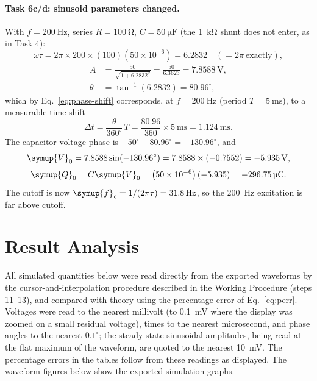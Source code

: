 \documentclass[12pt,a4paper]{article}
\begin{document}
	\paragraph{Task 6c/d: sinusoid parameters changed.}
	With $f = \SI{200}{\hertz}$, series $R = \SI{100}{\ohm}$,
	$C = \SI{50}{\micro\farad}$ (the \SI{1}{\kilo\ohm} shunt does not
	enter, as in Task 4):
	\begin{equation}
		\omega\tau = 2\pi \times 200 \times (100)\left(50\times 10^{-6}\right)
		= 6.2832 \quad \left(= 2\pi\ \text{exactly}\right),
	\end{equation}
	\begin{align}
		A &= \frac{50}{\sqrt{1 + 6.2832^2}}
		= \frac{50}{6.3623} = \SI{7.8588}{\volt},\\
		\theta &= \tan^{-1}(6.2832) = 80.96^{\circ},
	\end{align}
	which by Eq.~\eqref{eq:phase-shift} corresponds, at
	$f = \SI{200}{\hertz}$ (period $T = \SI{5}{\milli\second}$), to a
	measurable time shift
	\begin{equation}
		\Delta t = \frac{\theta}{360^{\circ}}\,T
		= \frac{80.96}{360} \times \SI{5}{\milli\second}
		= \SI{1.124}{\milli\second}.
	\end{equation}
	The capacitor-voltage phase is $-50^\circ - 80.96^\circ =
	-130.96^\circ$, and
	\begin{equation}
		\symup{V}_{0} = 7.8588 \sin(-130.96^{\circ})
		= 7.8588 \times (-0.7552) = \SI{-5.935}{\volt},
	\end{equation}
	\begin{equation}
		\symup{Q}_{0} = C \symup{V}_{0} = \left(50\times 10^{-6}\right)(-5.935)
		= \SI{-296.75}{\micro\coulomb}.
	\end{equation}
	The cutoff is now $\symup{f}_{\mathit{c}} = 1/(2\pi\tau) = \SI{31.8}{\hertz}$, so the
	\SI{200}{\hertz} excitation is far above cutoff.
	
	\section{Result Analysis}
	\label{sec:results}
	All simulated quantities below were read directly from the exported
	waveforms by the cursor-and-interpolation procedure described in the
	Working Procedure (steps 11--13), and compared with theory using the
	percentage error of Eq.~\eqref{eq:perr}.  Voltages were read to the
	nearest millivolt (to \SI{0.1}{\milli\volt} where the display was
	zoomed on a small residual voltage), times to the nearest
	microsecond, and phase angles
	to the nearest $0.1^{\circ}$; the steady-state sinusoidal amplitudes,
	being read at the flat maximum of the waveform, are quoted to the
	nearest \SI{10}{\milli\volt}.  The percentage errors in the tables
	follow from these readings as displayed.  The waveform figures below
	show the exported simulation graphs.
	
\end{document}
